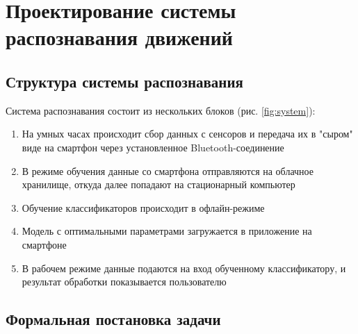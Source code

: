 \chapter{Проектирование системы распознавания движений}


\section{Структура системы распознавания}

Система распознавания состоит из нескольких блоков (рис. \ref{fig:system}):


\begin{enumerate}
\item На умных часах происходит сбор данных с сенсоров и передача их в "сыром" виде на смартфон через установленное Bluetooth-соединение
\item В режиме обучения данные со смартфона отправляются на облачное хранилище, откуда далее попадают на стационарный компьютер
\item Обучение классификаторов происходит в офлайн-режиме
\item Модель с оптимальными параметрами загружается в приложение на смартфоне
\item В рабочем режиме данные подаются на вход обученному классификатору, и результат обработки показывается пользователю
\end{enumerate}



\section{Формальная постановка задачи}


